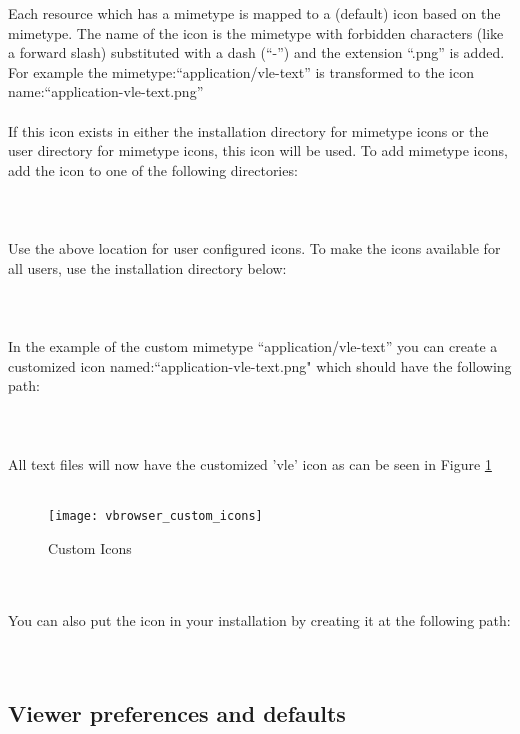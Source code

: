 Each resource which has a mimetype is mapped to a (default) icon based 
on the mimetype. The name of the icon is the mimetype with forbidden
characters (like a forward slash) substituted with a dash (``-'') and the
extension ``.png'' is added.
For example the mimetype:``application/vle-text'' is transformed to the icon 
name:``application-vle-text.png''\\
\\
If this icon exists in either the installation directory for mimetype icons or the
user directory for mimetype icons, this icon will be used. 
To add mimetype icons, add the icon to one of the following directories:\\
\\ 
\tab {}\\
\\ 
Use the above location for user configured icons. To make the icons
available for all users, use the installation directory below:\\
\\
\tab {}\\
\\
In the example of the custom mimetype ``application/vle-text'' you can create
a customized icon named:``application-vle-text.png" which should have the
following path:\\ \\
\tab {}\\
\\
All text files will now have the customized 'vle' icon as can be seen 
in Figure \ref{fig:custom_icons}\\
\\
\begin{figure}[htbp]
\centerline{\texttt{[image: vbrowser\_custom\_icons]}}
\caption{Custom Icons}
\label{fig:custom_icons}
\end{figure}\\
\\
You can also put the icon in your installation by creating it at the following
path:\\
\\
\tab {}\\

\subsection{Viewer preferences and defaults}

